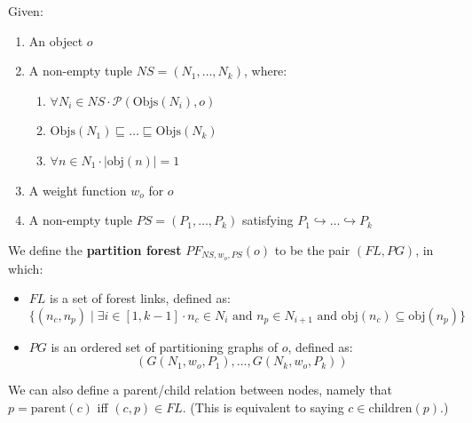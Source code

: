 \begin{definition}
Given:

\begin{enumerate}

\item An object $o$
\item A non-empty tuple $\textit{NS} = (N_1,\ldots,N_k)$, where:

\begin{enumerate}

\item $\forall N_i \in \textit{NS} \cdot \mathcal{P}(\mbox{Objs}(N_i),o)$
\item $\mbox{Objs}(N_1) \sqsubseteq \ldots \sqsubseteq \mbox{Objs}(N_k)$ 
\item $\forall n \in N_1 \cdot |\mbox{obj}(n)| = 1$

\end{enumerate}

\item A weight function $w_o$ for $o$
\item A non-empty tuple $\textit{PS} = (P_1,\ldots,P_k)$ satisfying $P_1 \hookrightarrow \ldots \hookrightarrow P_k$

\end{enumerate}

\noindent We define the \textbf{partition forest} $PF_{\textit{NS},w_o,\textit{PS}}(o)$ to be the pair $(\textit{FL},\textit{PG})$, in which:

\begin{itemize}

\item $\textit{FL}$ is a set of forest links, defined as:
%
\[
\{(n_c,n_p) \; | \; \exists i \in [1,k-1] \cdot n_c \in N_i \mbox { and } n_p \in N_{i+1} \mbox{ and } \mbox{obj}(n_c) \subseteq \mbox{obj}(n_p)\}
\]

\item $\textit{PG}$ is an ordered set of partitioning graphs of $o$, defined as:
%
\[
(G(N_1,w_o,P_1),\ldots,G(N_k,w_o,P_k))
\]

\end{itemize}

\end{definition}

\noindent We can also define a parent/child relation between nodes, namely that $p = \mbox{parent}(c)$ iff $(c,p) \in \textit{FL}$. (This is equivalent to saying $c \in \mbox{children}(p)$.)

